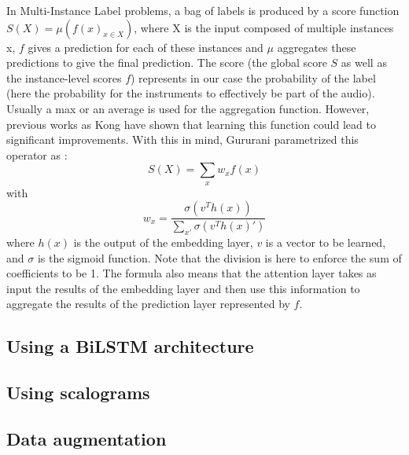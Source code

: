 \documentclass[final]{cvpr}
\begin{document}
In Multi-Instance Label problems, a bag of labels is produced by a score function $S(X)=\mu(f(x)_{x\in X})$, where X is the input composed of multiple instances x, $f$ gives a prediction for each of these instances and $\mu$ aggregates these predictions to give the final prediction. The score (the global score $S$ as well as the instance-level scores $f$) represents in our case the probability of the label (here the probability for the instruments to effectively be part of the audio). Usually a max or an average is used for the aggregation function. However, previous works as Kong \etal \cite{kong} have shown that learning this function could lead to significant improvements. With this in mind, Gururani \etal parametrized this operator as :
\[S(X)=\sum_{x}w_xf(x)\]
with 
\[w_x =\frac{\sigma(v^{T}h(x))}{\sum_{x'}\sigma(v^{T}h(x)')}\]
where $h(x)$ is the output of the embedding layer, $v$ is a vector to be learned, and $\sigma$ is the sigmoid function. Note that the division is here to enforce the sum of coefficients to be 1. The formula also means that the attention layer takes as input the results of the embedding layer and then use this information to aggregate the results of the prediction layer represented by $f$.
\subsection{Using a BiLSTM architecture}
\subsection{Using scalograms}
\subsection{Data augmentation}
\end{document}
